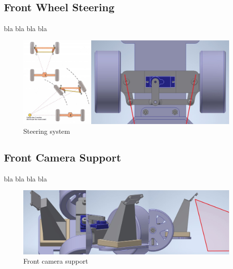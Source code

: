 \subsection{Front Wheel Steering}
\paragraph{}
bla
bla
bla
bla

\begin{figure}[!ht]
    \begin{center}
        \includegraphics[scale=0.45]{Images/steering.jpg}
    \end{center}
    \caption{Steering system}
    \label{fig:raspi_config}
\end{figure}

\subsection{Front Camera Support}
\paragraph{}
bla
bla
bla
bla

\begin{figure}[!ht]
    \begin{center}
        \includegraphics[scale=0.58]{Images/camera_support.jpg}
    \end{center}
    \caption{Front camera support}
    \label{fig:raspi_config}
\end{figure}

